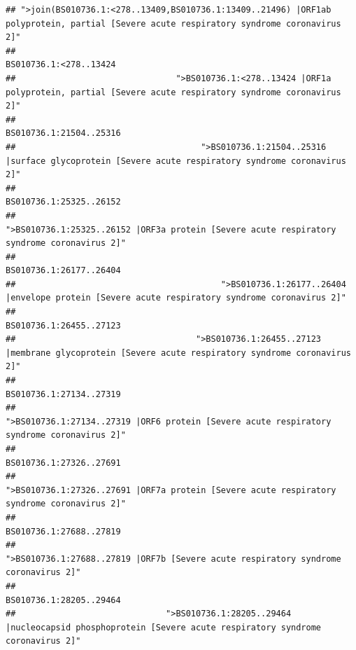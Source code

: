 \documentclass[
]{article}
\begin{document}
\begin{verbatim}
## ">join(BS010736.1:<278..13409,BS010736.1:13409..21496) |ORF1ab polyprotein, partial [Severe acute respiratory syndrome coronavirus 2]" 
##                                                                                                                 BS010736.1:<278..13424 
##                                ">BS010736.1:<278..13424 |ORF1a polyprotein, partial [Severe acute respiratory syndrome coronavirus 2]" 
##                                                                                                                BS010736.1:21504..25316 
##                                     ">BS010736.1:21504..25316 |surface glycoprotein [Severe acute respiratory syndrome coronavirus 2]" 
##                                                                                                                BS010736.1:25325..26152 
##                                            ">BS010736.1:25325..26152 |ORF3a protein [Severe acute respiratory syndrome coronavirus 2]" 
##                                                                                                                BS010736.1:26177..26404 
##                                         ">BS010736.1:26177..26404 |envelope protein [Severe acute respiratory syndrome coronavirus 2]" 
##                                                                                                                BS010736.1:26455..27123 
##                                    ">BS010736.1:26455..27123 |membrane glycoprotein [Severe acute respiratory syndrome coronavirus 2]" 
##                                                                                                                BS010736.1:27134..27319 
##                                             ">BS010736.1:27134..27319 |ORF6 protein [Severe acute respiratory syndrome coronavirus 2]" 
##                                                                                                                BS010736.1:27326..27691 
##                                            ">BS010736.1:27326..27691 |ORF7a protein [Severe acute respiratory syndrome coronavirus 2]" 
##                                                                                                                BS010736.1:27688..27819 
##                                                    ">BS010736.1:27688..27819 |ORF7b [Severe acute respiratory syndrome coronavirus 2]" 
##                                                                                                                BS010736.1:28205..29464 
##                              ">BS010736.1:28205..29464 |nucleocapsid phosphoprotein [Severe acute respiratory syndrome coronavirus 2]" 

\end{verbatim}
\end{document}
